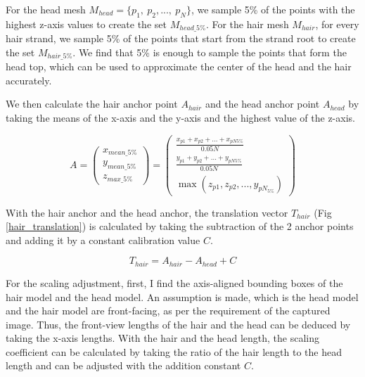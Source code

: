 For the head mesh $M_{head}=\{p_1,\ p_2,...,\ p_N\}$, we sample 5\% of the points with the highest z-axis values to create the set $M_{head\_5\%}$. For the hair mesh $M_{hair}$, for every hair strand, we sample 5\% of the points that start from the strand root to create the set $M_{hair\_5\%}$. We find that 5\% is enough to sample the points that form the head top, which can be used to approximate the center of the head and the hair accurately.


We then calculate the hair anchor point $A_{hair}$ and the head anchor point $A_{head}$ by taking the means of the x-axis and the y-axis and the highest value of the z-axis.

\begin{equation}
    A = \begin{pmatrix}
        x_{mean\_5\%} \\
        y_{mean\_5\%} \\
        z_{max\_5\%}
    \end{pmatrix}
    = \begin{pmatrix}
        \frac{x_{p1}+x_{p2}+...+x_{pN5\%}}{0.05N} \\
        \frac{y_{p1}+y_{p2}+...+y_{pN5\%}}{0.05N} \\
        \max(z_{p1},z_{p2},...,y_{pN_{5\%}})
    \end{pmatrix}
\end{equation}

With the hair anchor and the head anchor, the translation vector $T_{hair}$ (Fig \ref{hair_translation}) is calculated by taking the subtraction of the 2 anchor points and adding it by a constant calibration value $C$.

\begin{equation}
    T_{hair} = A_{hair} - A_{head} + C
\end{equation}

For the scaling adjustment, first, I find the axis-aligned bounding boxes of the hair model and the head model. An assumption is made, which is the head model and the hair model are front-facing, as per the requirement of the captured image. Thus, the front-view lengths of the hair and the head can be deduced by taking the x-axis lengths. With the hair and the head length, the scaling coefficient can be calculated by taking the ratio of the hair length to the head length and can be adjusted with the addition constant $C$.

